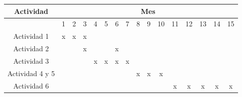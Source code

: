 \documentclass[10pt]{article}
\begin{document}
\begin{table}[!ht]
	\label{tab:kurskew}
	\begin{center}
		\begin{tabular}{| c | c | c | c | c | c | c | c | c | c | c |c | c |c |c |c |}\cline{1-16}
			\multicolumn{1}{|c|}{Actividad} & \multicolumn{15}{|c|}{Mes}\\ \hline
			\multicolumn{1}{|c|}{ } &	\multicolumn{1}{|c|}{ 1} & 					\multicolumn{1}{|c|}{2} & \multicolumn{1}{|c|}{3} & 		\multicolumn{1}{|c|}{4} & \multicolumn{1}{|c|}{ 5} & 					\multicolumn{1}{|c|}{6} & \multicolumn{1}{|c|}{7} & 		\multicolumn{1}{|c|}{8} & \multicolumn{1}{|c|}{ 9} & 					\multicolumn{1}{|c|}{10} & \multicolumn{1}{|c|}{11} & 		\multicolumn{1}{|c|}{12} & \multicolumn{1}{|c|}{13}& \multicolumn{1}{|c|}{14}& \multicolumn{1}{|c|}{15} \\ \hline
			Actividad 1 &  x& x & x &   &   &  &  & & & & & & & & \\ \hline
			Actividad  2 &  &  &  x&   &   & x &  & & & & & & & & \\ \hline
			Actividad 3  &  &  &  &  x & x& x & x &  &  &  & &   & & & \\ \hline
			Actividad  4 y 5 &  &  &  &   &  &   &   & x& x& x & &  & &  &  \\ \hline
			Actividad  6 &  &  &  &   &  &  &   & & & & x& x & x& x & x\\ \hline
		\end{tabular}
	\end{center}
\end{table}
\end{document}
